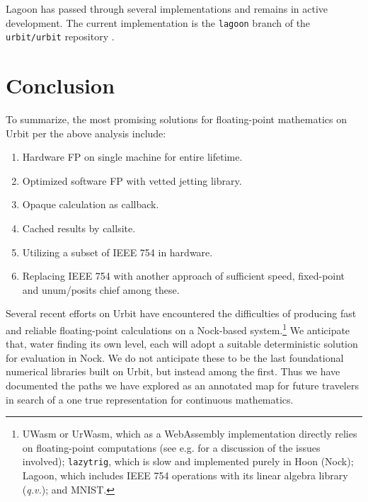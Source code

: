 \documentclass[twoside]{article}
\begin{document}
Lagoon has passed through several implementations and remains in active development.  The current implementation is the \texttt{lagoon} branch of the \texttt{urbit/urbit} repository \citep{Urbit}.


\section{Conclusion}

To summarize, the most promising solutions for floating-point mathematics on Urbit per the above analysis include:

\begin{enumerate}
  \item  Hardware FP on single machine for entire lifetime.
  \item  Optimized software FP with vetted jetting library.
  \item  Opaque calculation as callback.
  \item  Cached results by callsite.
  \item  Utilizing a subset of IEEE 754 in hardware.
  \item  Replacing IEEE 754 with another approach of sufficient speed, fixed-point and unum/posits chief among these.
\end{enumerate}

Several recent efforts on Urbit have encountered the difficulties of producing fast and reliable floating-point calculations on a Nock-based system.\footnote{UWasm or UrWasm, which as a WebAssembly implementation directly relies on floating-point computations \citep{UWasm} (see e.g. \citet{KloudKoder2022} for a discussion of the issues involved); \texttt{lazytrig}, which is slow and implemented purely in Hoon (Nock); Lagoon, which includes IEEE 754 operations with its linear algebra library (\emph{q.v.}); and MNIST.}  We anticipate that, water finding its own level, each will adopt a suitable deterministic solution for evaluation in Nock.  We do not anticipate these to be the last foundational numerical libraries built on Urbit, but instead among the first.  Thus we have documented the paths we have explored as an annotated map for future travelers in search of a one true representation for continuous mathematics.



\end{document}
